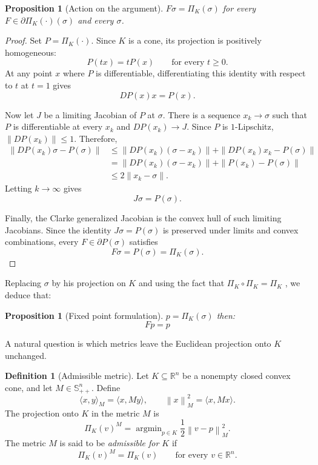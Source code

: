 \documentclass[a4paper,11pt]{book}
\theoremstyle{plain}
\newtheorem{proposition}[theorem]{Proposition}
\theoremstyle{definition}
\newtheorem{definition}[theorem]{Definition}
\theoremstyle{remark}
\numberwithin{equation}{chapter}
\numberwithin{algorithm}{chapter}
\newcommand{\proj}[2]{\Pi_{#2}\!\left(#1\right)}
\newcommand{\norm}[1]{\left\|#1\right\|}
\DeclareMathOperator*{\argmin}{argmin}
\begin{document}
	\begin{proposition}[Action on the argument]
		$F\sigma=\proj{\sigma}{K}$ for every
		$F\in\partial\proj{\cdot}{K}(\sigma)$ and every $\sigma$.
	\end{proposition}
	\begin{proof}
		Set $P=\proj{\cdot}{K}$. Since $K$ is a cone, its projection is positively
		homogeneous:
		\[
		P(tx)=tP(x)
		\qquad\text{for every }t\geq0.
		\]
		At any point $x$ where $P$ is differentiable, differentiating this identity
		with respect to $t$ at $t=1$ gives
		\[
		DP(x)x=P(x).
		\]
		
		Now let $J$ be a limiting Jacobian of $P$ at $\sigma$. There is a sequence
		$x_k\to\sigma$ such that $P$ is differentiable at every $x_k$ and
		$DP(x_k)\to J$. Since $P$ is $1$-Lipschitz,
		$\|DP(x_k)\|\leq1$. Therefore,
		\[
		\begin{aligned}
			\|DP(x_k)\sigma-P(\sigma)\|
			&\leq
			\|DP(x_k)(\sigma-x_k)\|
			+\|DP(x_k)x_k-P(\sigma)\| \\
			&=
			\|DP(x_k)(\sigma-x_k)\|
			+\|P(x_k)-P(\sigma)\| \\
			&\leq
			2\|x_k-\sigma\|.
		\end{aligned}
		\]
		Letting $k\to\infty$ gives
		\[
		J\sigma=P(\sigma).
		\]
		
		Finally, the Clarke generalized Jacobian is the convex hull of such limiting
		Jacobians. Since the identity $J\sigma=P(\sigma)$ is preserved under limits
		and convex combinations, every $F\in\partial P(\sigma)$ satisfies
		\[
		F\sigma=P(\sigma)=\proj{\sigma}{K}.
		\]
	\end{proof}
	Replacing $\sigma$ by his projection on $K$ and using the fact that $\Pi_{K}\circ \Pi_{K} = \Pi_{K}$ , we deduce that: 
	\begin{proposition}[Fixed point formulation]
		$p = \Pi_{K}(\sigma)$ then: $$ Fp = p$$
		
	\end{proposition}
	
	
	A natural question is which metrics leave the Euclidean projection onto $K$
	unchanged.
	
	\begin{definition}[Admissible metric]
		Let $K\subseteq\mathbb R^n$ be a nonempty closed convex cone, and let
		$M\in\mathbb S_{++}^n$. Define
		\[
		\langle x,y\rangle_M=\langle x,My\rangle,
		\qquad
		\norm{x}_M^2=\langle x,Mx\rangle.
		\]
		The projection onto $K$ in the metric $M$ is
		\[
		\proj{v}{K}^{M}
		=
		\argmin_{p\in K}\frac12\norm{v-p}_M^2.
		\]
		The metric $M$ is said to be \emph{admissible for $K$} if
		\[
		\proj{v}{K}^{M}=\proj{v}{K}
		\qquad\text{for every }v\in\mathbb R^n.
		\]
	\end{definition}
	
\end{document}
